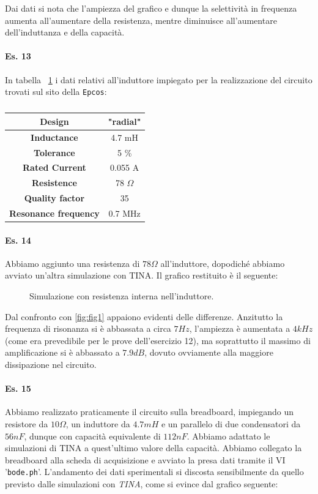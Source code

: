 \documentclass[journal, a4paper]{IEEEtran}
\begin{document}
Dai dati si nota che l'ampiezza del grafico e dunque la selettività in frequenza aumenta all'aumentare della resistenza, mentre diminuisce all'aumentare dell'induttanza e della capacità.

\paragraph{Es. 13}
In tabella ~\ref{tab:tab2} i dati relativi all'induttore impiegato per la realizzazione del circuito trovati sul sito della \texttt{Epcos}:

\begin{table}[htp]
\caption{}
\label{tab:tab2}
\centering
\begin{tabular}{c|c}
\hline
\textbf{Design} & "radial"\\
\hline
\textbf{Inductance} & 4.7 mH\\
\hline
\textbf{Tolerance} & 5 \% \\
\hline
\textbf{Rated Current} & 0.055 A\\
\hline
\textbf{Resistence} & 78 $\Omega$\\
\hline
\textbf{Quality factor} & 35\\
\hline
\textbf{Resonance frequency} & 0.7 MHz\\
\hline
\end{tabular}
\end{table}

\paragraph{Es. 14}

Abbiamo aggiunto una resistenza di $78 \Omega$ all'induttore, dopodiché abbiamo avviato un'altra simulazione con \textsc{TINA}. Il grafico restituito è il seguente:
\begin{figure}[htbp]
\centering
\caption{Simulazione con resistenza interna nell'induttore.}
\end{figure}

Dal confronto con \ref{fig:fig1} appaiono evidenti delle differenze. Anzitutto la frequenza di risonanza si è abbassata a circa $7 Hz$, l'ampiezza è aumentata a $4 \si{kHz}$ (come era prevedibile per le prove dell'esercizio 12), ma soprattutto il massimo di amplificazione si è abbassato a $7.9 \si{dB}$, dovuto ovviamente alla maggiore dissipazione nel circuito.

\paragraph{Es. 15}
Abbiamo realizzato praticamente il circuito sulla breadboard, impiegando un resistore da $10 \Omega$, un induttore da $4.7 \si{mH} $ e un parallelo di due condensatori da $56 \si{nF}$, dunque con capacità equivalente di $112 \si{nF}$. Abbiamo adattato le simulazioni di \textsc{TINA} a quest'ultimo valore della capacità. Abbiamo collegato la breadboard alla scheda di acquisizione e avviato la presa dati tramite il VI '\texttt{bode.ph}'. L'andamento dei dati sperimentali si discosta sensibilmente da quello previsto dalle simulazioni con \textit{TINA}, come si evince dal grafico seguente:
\end{document}
